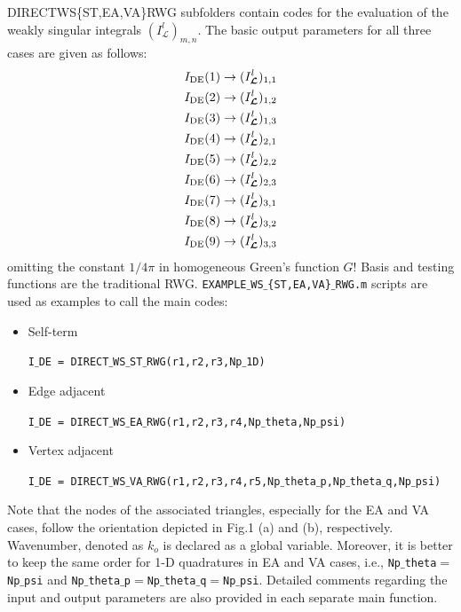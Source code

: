 \documentclass[a4wide,11pt]{article}
\newcommand{\bc}[1]{\boldsymbol{\mathcal{#1}}}
\begin{document}
DIRECT\textunderscore WS\textunderscore\{ST,EA,VA\}\textunderscore RWG subfolders contain codes for the evaluation of the weakly singular integrals $(I_{\bc{L}}^l)_{m,n}$. The basic output parameters for all three cases are given as follows:
\begin{equation*}
\begin{split}
I_{\rm DE}(1) \rightarrow (I_{\bc{L}}^l)_{1,1} \\
I_{\rm DE}(2) \rightarrow (I_{\bc{L}}^l)_{1,2}\\
I_{\rm DE}(3) \rightarrow (I_{\bc{L}}^l)_{1,3} \\
I_{\rm DE}(4) \rightarrow (I_{\bc{L}}^l)_{2,1} \\
I_{\rm DE}(5) \rightarrow (I_{\bc{L}}^l)_{2,2} \\
I_{\rm DE}(6) \rightarrow (I_{\bc{L}}^l)_{2,3} \\
I_{\rm DE}(7) \rightarrow (I_{\bc{L}}^l)_{3,1} \\
I_{\rm DE}(8) \rightarrow (I_{\bc{L}}^l)_{3,2} \\
I_{\rm DE}(9) \rightarrow (I_{\bc{L}}^l)_{3,3}
\end{split}
\end{equation*}
omitting the constant $1/4\pi$ in homogeneous Green's function $G$! Basis and testing functions are the traditional RWG. \texttt{EXAMPLE$\_$WS$\_$\{ST,EA,VA\}$\_$RWG.m} scripts are used as examples to call the main codes:
\begin{itemize}
\item Self-term

\texttt{I$\_$DE = DIRECT$\_$WS$\_$ST$\_$RWG(r1,r2,r3,Np$\_$1D)}
\item Edge adjacent

\texttt{I$\_$DE = DIRECT$\_$WS$\_$EA$\_$RWG(r1,r2,r3,r4,Np$\_$theta,Np$\_$psi)}
\item Vertex adjacent

\texttt{I$\_$DE = DIRECT$\_$WS$\_$VA$\_$RWG(r1,r2,r3,r4,r5,Np$\_$theta$\_$p,Np$\_$theta$\_$q,Np$\_$psi)}
\end{itemize}
Note that the nodes of the associated triangles, especially for the EA and VA cases, follow the orientation depicted in Fig.1 (a) and (b), respectively. Wavenumber, denoted as \texttt{$k_o$} is declared as a global variable. Moreover, it is better to keep the same order for 1-D quadratures in EA and VA cases, i.e., \texttt{Np$\_$theta$=$Np$\_$psi} and \texttt{Np$\_$theta$\_$p$=$Np$\_$theta$\_$q$=$Np$\_$psi}. Detailed comments regarding the input and output parameters are also provided in each separate main function.
\end{document}
